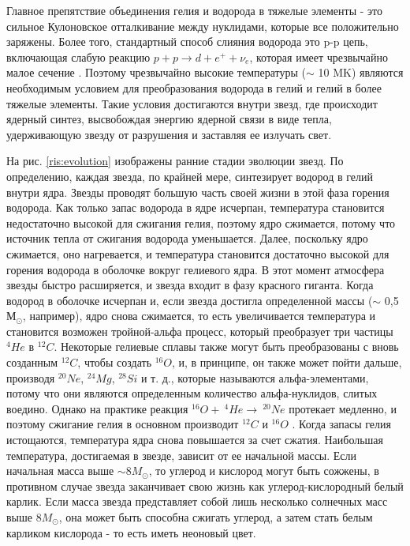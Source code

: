 \documentclass[%
master,    %
natbib,      %
subf,        %
href,        %
colorlinks,  %
]{disser}
\begin{document}
Главное препятствие объединения гелия и водорода в тяжелые элементы - это сильное Кулоновское отталкивание между нуклидами, которые все положительно заряжены. Более того, стандартный способ слияния водорода это p-p цепь, включающая слабую реакцию $p + p \rightarrow d + e^+ + \nu_e$, которая имеет чрезвычайно малое сечение \cite{cauldrons}. Поэтому чрезвычайно высокие температуры ($\sim$ 10 MK) являются необходимым условием для преобразования водорода в гелий и гелий в более тяжелые элементы. Такие условия достигаются внутри звезд, где происходит ядерный синтез\cite{energy}, высвобождая энергию ядерной связи в виде тепла, удерживающую звезду от разрушения и заставляя ее излучать свет.

На рис. \ref{ris:evolution} изображены ранние стадии эволюции звезд. По определению, каждая звезда, по крайней мере, синтезирует водород в гелий внутри ядра. Звезды проводят большую часть своей жизни в этой фаза горения водорода. Как только запас водорода в ядре исчерпан, температура становится недостаточно высокой для сжигания гелия, поэтому ядро сжимается, потому что источник тепла от сжигания водорода уменьшается. Далее, поскольку ядро сжимается, оно нагревается, и температура становится достаточно высокой для горения водорода в оболочке вокруг гелиевого ядра. В этот момент атмосфера звезды быстро расширяется, и звезда входит в фазу красного гиганта. Когда водород в оболочке исчерпан и, если звезда достигла определенной массы ($\sim$ 0,5 $М_\odot$, например), ядро снова сжимается, то есть увеличивается температура и становится возможен тройной-альфа процесс, который  преобразует три частицы $^4He$ в $^{12}C$. Некоторые гелиевые сплавы также могут быть преобразованы с вновь созданным $^{12}C$, чтобы создать $^{16}O$, и, в принципе, он также может пойти дальше, производя $^{20}Ne$, $^{24}Mg$, $^{28}Si$ и т. д., которые называются альфа-элементами, потому что они являются определенным количество альфа-нуклидов, слитых воедино. Однако на практике реакция $^{16}O + \ ^4He \rightarrow \ ^{20}Ne$ протекает медленно, и поэтому сжигание гелия в основном производит $^{12}C$ и $^{16}O$ \cite{interiors}. Когда запасы гелия истощаются, температура ядра снова повышается за счет сжатия. Наибольшая температура, достигаемая в звезде, зависит от ее начальной массы. Если начальная масса выше $\sim 8 M_\odot$, то углерод и кислород могут быть сожжены, в противном случае звезда заканчивает свою жизнь как углерод-кислородный белый карлик. Если масса звезда представляет собой лишь несколько солнечных масс выше $8 M_\odot$, она может быть способна сжигать углерод, а затем стать белым карликом кислорода - то есть иметь неоновый цвет.
\end{document}
